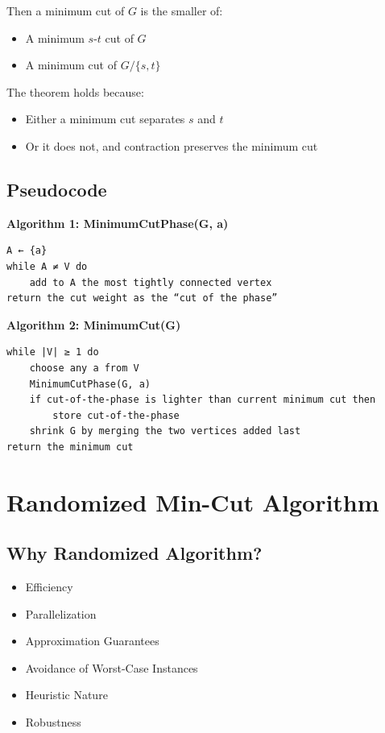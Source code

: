 \documentclass[12pt]{article}
\begin{document}
Then a minimum cut of \( G \) is the smaller of:
\begin{itemize}
    \item A minimum \( s\text{-}t \) cut of \( G \)
    \item A minimum cut of \( G/\{s,t\} \)
\end{itemize}

The theorem holds because:
\begin{itemize}
    \item Either a minimum cut separates \( s \) and \( t \)
    \item Or it does not, and contraction preserves the minimum cut
\end{itemize}

\subsection*{Pseudocode}

\textbf{Algorithm 1: MinimumCutPhase(G, a)}

\begin{verbatim}
A ← {a}
while A ≠ V do
    add to A the most tightly connected vertex
return the cut weight as the “cut of the phase”
\end{verbatim}

\textbf{Algorithm 2: MinimumCut(G)}

\begin{verbatim}
while |V| ≥ 1 do
    choose any a from V
    MinimumCutPhase(G, a)
    if cut-of-the-phase is lighter than current minimum cut then
        store cut-of-the-phase
    shrink G by merging the two vertices added last
return the minimum cut
\end{verbatim}

\section*{Randomized Min-Cut Algorithm}

\subsection*{Why Randomized Algorithm?}

\begin{itemize}
    \item Efficiency
    \item Parallelization
    \item Approximation Guarantees
    \item Avoidance of Worst-Case Instances
    \item Heuristic Nature
    \item Robustness
\end{itemize}
\end{document}
